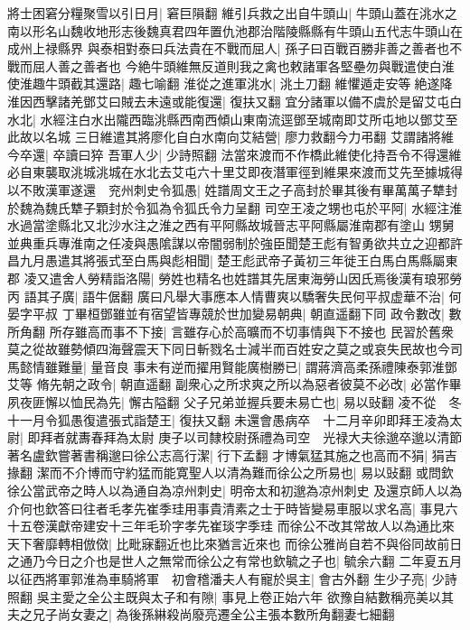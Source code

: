 將士困窘分糧聚雪以引日月|{
	窘巨隕翻}
維引兵救之出自牛頭山|{
	牛頭山蓋在洮水之南以形名山魏收地形志後魏真君四年置仇池郡治階陵縣縣有牛頭山五代志牛頭山在成州上禄縣界}
與泰相對泰曰兵法貴在不戰而屈人|{
	孫子曰百戰百勝非善之善者也不戰而屈人善之善者也}
今絶牛頭維無反道則我之禽也敕諸軍各堅壘勿與戰遣使白淮使淮趣牛頭截其還路|{
	趣七喻翻}
淮從之進軍洮水|{
	洮土刀翻}
維懼遁走安等絶遂降淮因西擊諸羌鄧艾曰賊去未遠或能復還|{
	復扶又翻}
宜分諸軍以備不虞於是留艾屯白水北|{
	水經注白水出隴西臨洮縣西南西傾山東南流逕鄧至城南即艾所屯地以鄧艾至此故以名城}
三日維遣其將廖化自白水南向艾結營|{
	廖力救翻今力弔翻}
艾謂諸將維今卒還|{
	卒讀曰猝}
吾軍人少|{
	少詩照翻}
法當來渡而不作橋此維使化持吾令不得還維必自東襲取洮城洮城在水北去艾屯六十里艾即夜潛軍徑到維果來渡而艾先至據城得以不敗漢軍遂還　兖州刺史令狐愚|{
	姓譜周文王之子高封於畢其後有畢萬萬子犨封於魏為魏氏犨子顆封於令狐為令狐氏令力呈翻}
司空王凌之甥也屯於平阿|{
	水經注淮水過當塗縣北又北沙水注之淮之西有平阿縣故城晉志平阿縣屬淮南郡有塗山}
甥舅並典重兵專淮南之任凌與愚隂謀以帝闇弱制於強臣聞楚王彪有智勇欲共立之迎都許昌九月愚遣其將張式至白馬與彪相聞|{
	楚王彪武帝子黃初三年徙王白馬白馬縣屬東郡}
凌又遣舍人勞精詣洛陽|{
	勞姓也精名也姓譜其先居東海勞山因氏焉後漢有琅邪勞丙}
語其子廣|{
	語牛倨翻}
廣曰凡舉大事應本人情曹爽以驕奢失民何平叔虚華不治|{
	何晏字平叔}
丁畢桓鄧雖並有宿望皆專競於世加變易朝典|{
	朝直遥翻下同}
政令數改|{
	數所角翻}
所存雖高而事不下接|{
	言雖存心於高曠而不切事情與下不接也}
民習於舊衆莫之從故雖勢傾四海聲震天下同日斬戮名士減半而百姓安之莫之或哀失民故也今司馬懿情雖難量|{
	量音良}
事未有逆而擢用賢能廣樹勝已|{
	謂蔣濟高柔孫禮陳泰郭淮鄧艾等}
脩先朝之政令|{
	朝直遥翻}
副衆心之所求爽之所以為惡者彼莫不必改|{
	必當作畢}
夙夜匪懈以恤民為先|{
	懈古隘翻}
父子兄弟並握兵要未易亡也|{
	易以䜴翻}
凌不從　冬十一月令狐愚復遣張式詣楚王|{
	復扶又翻}
未還會愚病卒　十二月辛卯即拜王凌為太尉|{
	即拜者就夀春拜為太尉}
庚子以司隸校尉孫禮為司空　光禄大夫徐邈卒邈以清節著名盧欽嘗著書稱邈曰徐公志高行潔|{
	行下孟翻}
才博氣猛其施之也高而不狷|{
	狷吉掾翻}
潔而不介博而守約猛而能寛聖人以清為難而徐公之所易也|{
	易以䜴翻}
或問欽徐公當武帝之時人以為通自為凉州刺史|{
	明帝太和初邈為凉州刺史}
及還京師人以為介何也欽答曰往者毛孝先崔季珪用事貴清素之士于時皆變易車服以求名高|{
	事見六十五卷漢獻帝建安十三年毛玠字孝先崔琰字季珪}
而徐公不改其常故人以為通比來天下奢靡轉相倣傚|{
	比毗寐翻近也比來猶言近來也}
而徐公雅尚自若不與俗同故前日之通乃今日之介也是世人之無常而徐公之有常也欽毓之子也|{
	毓余六翻}
二年夏五月以征西將軍郭淮為車騎將軍　初會稽潘夫人有寵於吳主|{
	會古外翻}
生少子亮|{
	少詩照翻}
吳主愛之全公主既與太子和有隙|{
	事見上卷正始六年}
欲豫自結數稱亮美以其夫之兄子尚女妻之|{
	為後孫綝殺尚廢亮遷全公主張本數所角翻妻七細翻}
